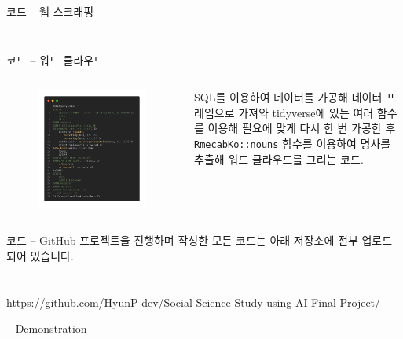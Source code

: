 \documentclass[mathserif, aspectratio=169]{beamer}
\begin{document}
\begin{frame}{코드 -- 웹 스크래핑}
\begin{columns}
\begin{column}{0.5\linewidth}
\begin{figure}
            \end{figure}
        \end{column}
    \end{columns}
\end{frame}
\begin{frame}{코드 -- 워드 클라우드}
    \begin{columns}
        \begin{column}{0.5\linewidth}
            \centering
            \begin{figure}
                \includegraphics[scale = 0.12]{images/codes/wordcloud.png}
            \end{figure}
        \end{column}
        \begin{column}{0.5\linewidth}
            \justifying
            SQL를 이용하여 데이터를 가공해 데이터 프레임으로 가져와
            tidyverse에 있는 여러 함수를 이용해 필요에 맞게 다시 한 번 가공한 후
            \texttt{RmecabKo::nouns} 함수를 이용하여 명사를 추출해
            워드 클라우드를 그리는 코드.
        \end{column}
    \end{columns}
\end{frame}
\begin{frame}{코드 -- GitHub}
    \centering
    프로젝트을 진행하며 작성한 모든 코드는 아래 저장소에 전부 업로드 되어 있습니다.\\~\\~\\
    \href{https://github.com/HyunP-dev/Social-Science-Study-using-AI-Final-Project/}
         {https://github.com/HyunP-dev/Social-Science-Study-using-AI-Final-Project/}
\end{frame}
\begin{frame}
    \centering
    \Huge{-- Demonstration --}
\end{frame}
\end{document}
